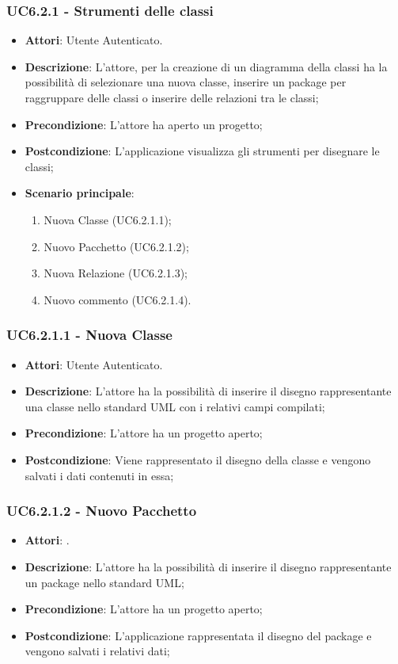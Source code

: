 \subsubsection{UC6.2.1 - Strumenti delle classi} 
\label{sssec:UC6.2.1} 
\begin{itemize} 
\item \textbf{Attori}: Utente Autenticato.
\item \textbf{Descrizione}: L'attore, per la creazione di un diagramma della classi ha la possibilità di selezionare una nuova classe, inserire un package per raggruppare delle classi o inserire delle relazioni tra le classi;
\item \textbf{Precondizione}: L'attore ha aperto un progetto;
\item \textbf{Postcondizione}: L'applicazione visualizza gli strumenti per disegnare le classi;
\item \textbf{Scenario principale}: \begin{enumerate}\item Nuova Classe (UC6.2.1.1);\item Nuovo Pacchetto (UC6.2.1.2);\item Nuova Relazione (UC6.2.1.3);\item Nuovo commento (UC6.2.1.4). 
 \end{enumerate}
\end{itemize} 
\subsubsection{UC6.2.1.1 - Nuova Classe} 
\label{sssec:UC6.2.1.1} 
\begin{itemize} 
\item \textbf{Attori}: Utente Autenticato.
\item \textbf{Descrizione}: L'attore ha la possibilità di inserire il disegno rappresentante una classe nello standard UML con i relativi campi compilati;
\item \textbf{Precondizione}: L'attore ha un progetto aperto;
\item \textbf{Postcondizione}: Viene rappresentato il disegno della classe e vengono salvati i dati contenuti in essa;
\end{itemize} 
\subsubsection{UC6.2.1.2 - Nuovo Pacchetto} 
\label{sssec:UC6.2.1.2} 
\begin{itemize} 
\item \textbf{Attori}: .
\item \textbf{Descrizione}: L'attore ha la possibilità di inserire il disegno rappresentante un package nello standard UML;
\item \textbf{Precondizione}: L'attore ha un progetto aperto;
\item \textbf{Postcondizione}: L'applicazione rappresentata il disegno del package e vengono salvati i relativi dati;
\end{itemize} 
